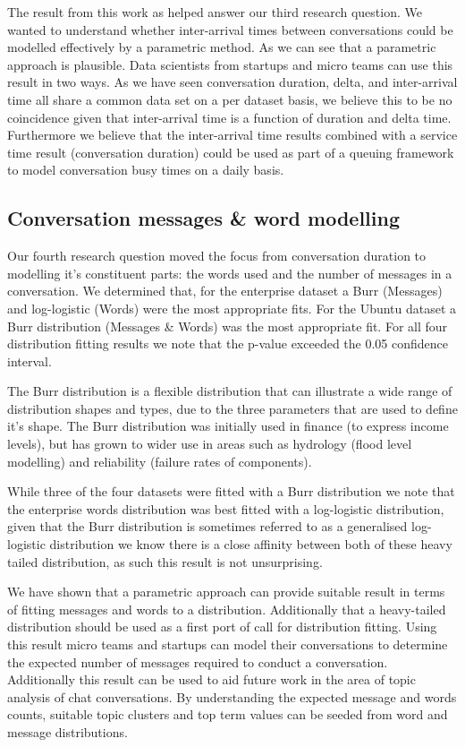 \documentclass[conference]{IEEEtran}
\begin{document}
The result from this work as helped answer our third research question. We wanted to understand whether inter-arrival times between conversations could be modelled effectively by a parametric method. As we can see that a parametric approach is plausible. Data scientists from startups and micro teams can use this result in two ways. As we have seen conversation duration, delta, and inter-arrival time all share a common data set on a per dataset basis, we believe this to be no coincidence given that inter-arrival time is a function of duration and delta time. Furthermore we believe that the inter-arrival time results combined with a service time result (conversation duration) could be used as part of a queuing framework to model conversation busy times on a daily basis.

\subsection{Conversation messages \& word modelling}

Our fourth research question moved the focus from conversation duration to modelling it's constituent parts: the words used and the number of messages in a conversation. We determined that, for the enterprise dataset a Burr (Messages) and log-logistic (Words) were the most appropriate fits. For the Ubuntu dataset a Burr distribution (Messages \& Words) was the most appropriate fit. For all four distribution fitting results we note that the p-value exceeded the 0.05 confidence interval.  

The Burr distribution is a flexible distribution that can illustrate a wide range of distribution shapes and types, due to the three parameters that are used to define it's shape. The Burr distribution was initially used in finance (to express income levels), but has grown to wider use in areas such as hydrology (flood level modelling) and reliability (failure rates of components). 

While three of the four datasets were fitted with a Burr distribution we note that the enterprise words distribution was best fitted with a log-logistic distribution, given that the Burr distribution is sometimes referred to as a generalised log-logistic distribution we know there is a close affinity between both of these heavy tailed distribution, as such this result is not unsurprising.

We have shown that a parametric approach can provide suitable result in terms of fitting messages and words to a distribution. Additionally that a heavy-tailed distribution should be used as a first port of call for distribution fitting. Using this result micro teams and startups can model their conversations to determine the expected number of messages required to conduct a conversation. Additionally this result can be used to aid future work in the area of topic analysis of chat conversations. By understanding the expected message and words counts, suitable topic clusters and top term values can be seeded from word and message distributions.
\end{document}
